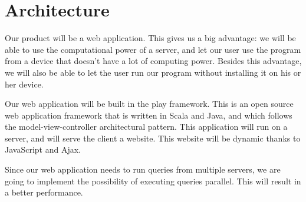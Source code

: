 \section{Architecture}
Our product will be a web application. This gives us a big advantage: we will be able to use the computational power of a server, and let our user use the program from a device that doesn't have a lot of computing power. Besides this advantage, we will also be able to let the user run our program without installing it on his or her device. 

Our web application will be built in the play framework. This is an open source web application framework that is written in Scala and Java, and which follows the model-view-controller architectural pattern. This application will run on a server, and will serve the client a website. This website will be dynamic thanks to JavaScript and Ajax. 

Since our web application needs to run queries from multiple servers, we are going to implement the possibility of executing queries parallel. This will result in a better performance.     